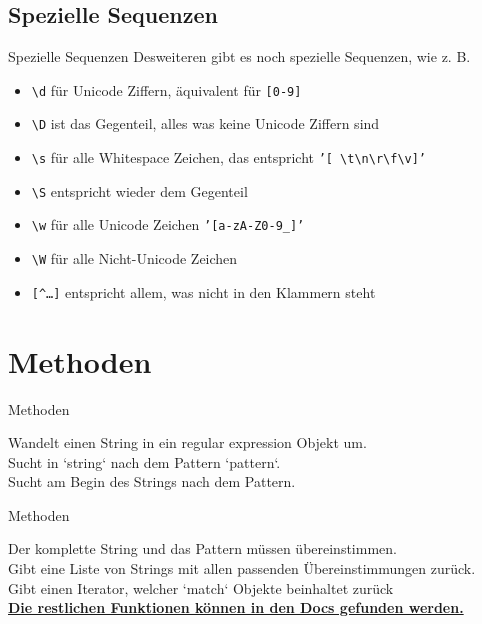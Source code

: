 \subsection{Spezielle Sequenzen}
\begin{frame}{Spezielle Sequenzen}
	Desweiteren gibt es noch spezielle Sequenzen, wie z. B.\\[.25cm]
	\begin{itemize}
		\item \texttt{\textbackslash{}d} für Unicode Ziffern, äquivalent für \texttt{[0-9]}
		\item \texttt{\textbackslash{}D} ist das Gegenteil, alles was keine Unicode Ziffern sind
		\item \texttt{\textbackslash{}s} für alle Whitespace Zeichen, das entspricht \texttt{'[\ \textbackslash{}t\textbackslash{}n\textbackslash{}r\textbackslash{}f\textbackslash{}v]'}
		\item \texttt{\textbackslash{}S} entspricht wieder dem Gegenteil
		\item \texttt{\textbackslash{}w} für alle Unicode Zeichen \texttt{'[a-zA-Z0-9\_]'}
		\item \texttt{\textbackslash{}W} für alle Nicht-Unicode Zeichen
		\item \texttt{[\^{}\ldots]} entspricht allem, was nicht in den Klammern steht
	\end{itemize}
\end{frame}

\section{Methoden}
\begin{frame}[fragile]{Methoden}
	
	Wandelt einen String in ein regular expression Objekt um.\\[.25cm]
	
	Sucht in `string` nach dem Pattern `pattern`.\\[.25cm]
	
	Sucht am Begin des Strings nach dem Pattern.
\end{frame}

\begin{frame}[fragile]{Methoden}
	
	Der komplette String und das Pattern müssen übereinstimmen.\\[.25cm]
	
	Gibt eine Liste von Strings mit allen passenden Übereinstimmungen zurück.\\[.25cm]
	
	Gibt einen Iterator, welcher `match` Objekte beinhaltet zurück\\[.25cm]
	\textbf{\href{https://docs.python.org/3/library/re.html}{Die restlichen Funktionen können in den Docs gefunden werden.}}
\end{frame}

